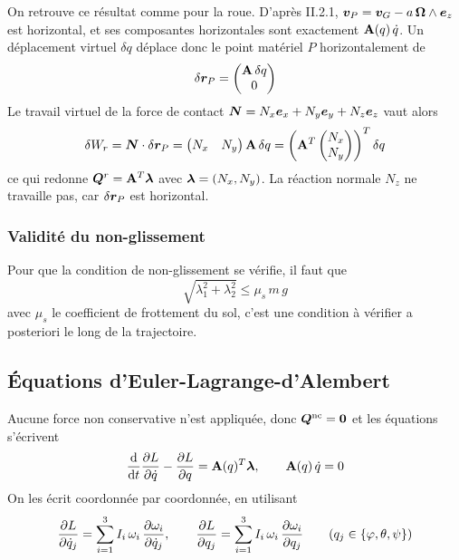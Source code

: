 \begin{remarque}
    On retrouve ce résultat comme pour la roue. D'après II.2.1,
    $\bm{v}_P = \bm{v}_G - a\,\bm{\Omega}\wedge\bm{e}_z$ est
    horizontal, et ses composantes horizontales sont exactement
    $\mathbf{A}(q)\,\dot q$. Un déplacement virtuel $\delta q$ déplace
    donc le point matériel $P$ horizontalement de
    \[
        \delta\bm{r}_P = \begin{pmatrix}
            \mathbf{A}\,\delta q\\ 0
        \end{pmatrix}
    \]
    Le travail virtuel de la force de contact
    $\bm{N} = N_x\bm{e}_x + N_y\bm{e}_y + N_z\bm{e}_z$ vaut
    alors
    \[
        \delta W_r = \bm{N}\cdot\delta\bm{r}_P
        = \begin{pmatrix} N_x & N_y \end{pmatrix}\mathbf{A}\,\delta q
        = \left(\mathbf{A}^T\begin{pmatrix} N_x\\ N_y \end{pmatrix}
        \right)^T\delta q
    \]
    ce qui redonne $\bm{Q}^r = \mathbf{A}^T\bm{\lambda}$ avec
    $\bm{\lambda} = (N_x,N_y)$. La réaction normale $N_z$ ne
    travaille pas, car $\delta\bm{r}_P$ est horizontal.
\end{remarque}



\subsubsection{Validité du non-glissement}

Pour que la condition de non-glissement se vérifie, il faut que 
\[
    \sqrt{\lambda_1^2 + \lambda_2^2} \leq \mu_s\,m\,g
\]
avec $\mu _s$ le coefficient de frottement du sol, c'est une condition à vérifier a posteriori le long de la trajectoire.

\subsection{Équations d'Euler-Lagrange-d'Alembert}

Aucune force non conservative n'est appliquée, donc
$\bm{Q}^{\mathrm{nc}} = \bm{0}$ et les équations s'écrivent
\[
    \frac{\mathrm{d}}{\mathrm{d} t}\frac{\partial L}{\partial \dot q} - \frac{\partial L}{\partial q} = \mathbf{A}(q)^T\bm{\lambda},
    \qquad
    \mathbf{A}(q)\,\dot q = 0
\]
On les écrit coordonnée par coordonnée, en utilisant
\[
    \frac{\partial L}{\partial \dot q_j} = \sum_{i=1}^{3} I_i\,\omega_i\,
    \frac{\partial \omega_i}{\partial \dot q_j},
    \qquad
    \frac{\partial L}{\partial q_j} = \sum_{i=1}^{3} I_i\,\omega_i\,\frac{\partial \omega_i}{\partial q_j}
    \qquad (q_j\in\{\varphi,\theta,\psi\})
\]

